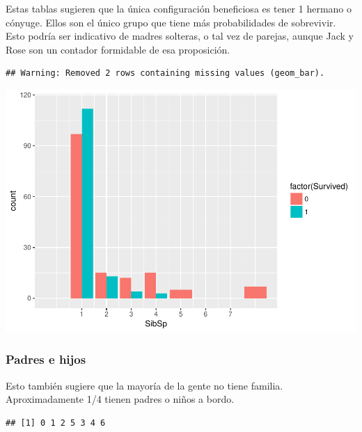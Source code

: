 \documentclass[]{article}
\newenvironment{Shaded}{\begin{snugshade}}{\end{snugshade}}
\newcommand{\KeywordTok}[1]{\textcolor[rgb]{0.13,0.29,0.53}{\textbf{#1}}}
\newcommand{\OperatorTok}[1]{\textcolor[rgb]{0.81,0.36,0.00}{\textbf{#1}}}
\newcommand{\NormalTok}[1]{#1}
\begin{document}
Estas tablas sugieren que la única configuración beneficiosa es tener 1
hermano o cónyuge. Ellos son el único grupo que tiene más probabilidades
de sobrevivir. Esto podría ser indicativo de madres solteras, o tal vez
de parejas, aunque Jack y Rose son un contador formidable de esa
proposición.

\begin{verbatim}
## Warning: Removed 2 rows containing missing values (geom_bar).
\end{verbatim}

\includegraphics{titanicDataClean_files/figure-latex/unnamed-chunk-3-1.pdf}

\subsubsection{Padres e hijos}\label{padres-e-hijos}

Esto también sugiere que la mayoría de la gente no tiene familia.
Aproximadamente 1/4 tienen padres o niños a bordo.

\begin{Shaded}
\end{Shaded}

\begin{verbatim}
## [1] 0 1 2 5 3 4 6
\end{verbatim}

\begin{Shaded}
\end{Shaded}
\end{document}
